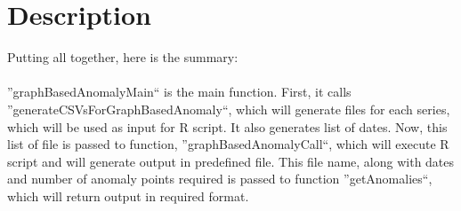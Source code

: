 \section{Description}

Putting all together, here is the summary:\\
\\
''graphBasedAnomalyMain`` is the main function. First, it calls 
''generateCSVsForGraphBasedAnomaly``, which will generate files for each 
series, which will be used as input for R script. It also generates list of 
dates. Now, this list of file is passed to function, ''graphBasedAnomalyCall``, 
which will execute R script and will generate output in predefined file. This 
file name, along with dates and number of anomaly points required is passed to 
function  ''getAnomalies``, which will return output in required format.